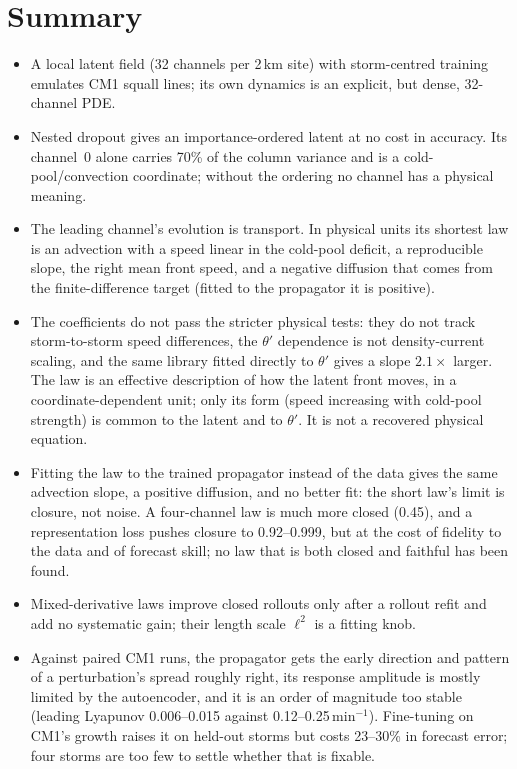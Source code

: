 \documentclass[11pt]{article}
\begin{document}
\section{Summary}
\begin{itemize}
\item A local latent field (32 channels per 2\,km site) with storm-centred training emulates CM1 squall lines; its own dynamics is an explicit, but dense, 32-channel PDE.
\item Nested dropout gives an importance-ordered latent at no cost in accuracy. Its channel~0 alone carries 70\% of the column variance and is a cold-pool/convection coordinate; without the ordering no channel has a physical meaning.
\item The leading channel's evolution is transport. In physical units its shortest law is an advection with a speed linear in the cold-pool deficit, a reproducible slope, the right mean front speed, and a negative diffusion that comes from the finite-difference target (fitted to the propagator it is positive).
\item The coefficients do not pass the stricter physical tests: they do not track storm-to-storm speed differences, the $\theta'$ dependence is not density-current scaling, and the same library fitted directly to $\theta'$ gives a slope $2.1\times$ larger. The law is an effective description of how the latent front moves, in a coordinate-dependent unit; only its form (speed increasing with cold-pool strength) is common to the latent and to $\theta'$. It is not a recovered physical equation.
\item Fitting the law to the trained propagator instead of the data gives the same advection slope, a positive diffusion, and no better fit: the short law's limit is closure, not noise. A four-channel law is much more closed (0.45), and a representation loss pushes closure to 0.92--0.999, but at the cost of fidelity to the data and of forecast skill; no law that is both closed and faithful has been found.
\item Mixed-derivative laws improve closed rollouts only after a rollout refit and add no systematic gain; their length scale $\ell^2$ is a fitting knob.
\item Against paired CM1 runs, the propagator gets the early direction and pattern of a perturbation's spread roughly right, its response amplitude is mostly limited by the autoencoder, and it is an order of magnitude too stable (leading Lyapunov 0.006--0.015 against 0.12--0.25\,min$^{-1}$). Fine-tuning on CM1's growth raises it on held-out storms but costs 23--30\% in forecast error; four storms are too few to settle whether that is fixable.
\end{itemize}
\end{document}
